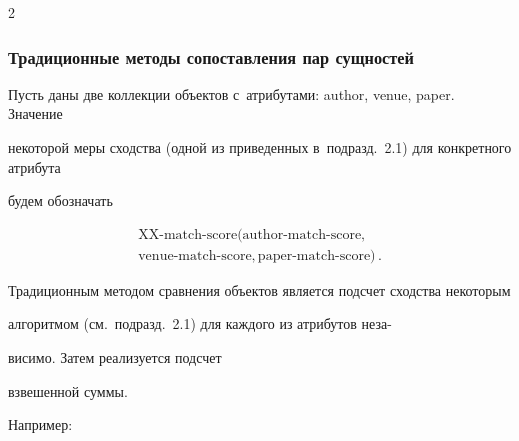\begin{multicols}{2}
  \vspace*{-3pt}



  \subsubsection{Традиционные методы сопоставления пар сущностей}



  Пусть даны две коллекции объектов с~атрибутами: author, venue, paper. Значение

некоторой меры сходства (одной из приведенных в~подразд.~2.1) для конкретного атрибута

будем обозначать



\vspace*{-3pt}



\noindent

\begin{multline*}

\mathrm{XX}\mbox{-}\mathrm{match}\mbox{-}\mathrm{score}

(\mathrm{author}\mbox{-}\mathrm{match}\mbox{-}\mathrm{score},\\

  \mathrm{venue}\mbox{-}\mathrm{match}\mbox{-}\mathrm{score},

  \mathrm{paper}\mbox{-}\mathrm{match}\mbox{-}\mathrm{score})\,.

\end{multline*}



\vspace*{-3pt}



  Традиционным методом сравнения объектов является подсчет сходства некоторым

алгоритмом (см.\ подразд.~2.1) для каждого из атрибутов неза-\linebreak\vspace*{-12pt}



\columnbreak



\noindent

висимо. Затем реализуется подсчет

взвешенной суммы.



  Например:




\end{multicols}
